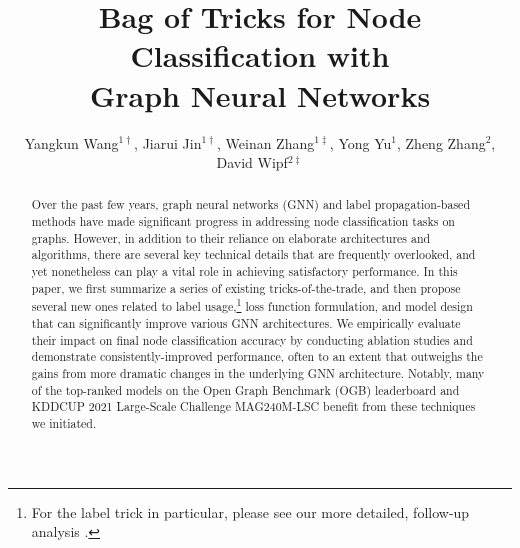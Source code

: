 \documentclass[sigconf,screen,nonacm]{acmart} \usepackage{booktabs}
\begin{document}
\sloppy


\title{Bag of Tricks for Node Classification with\\Graph Neural Networks}
\author{Yangkun Wang$^{1\dag}$, Jiarui Jin$^{1\dag}$, Weinan Zhang$^{1\ddagger}$, Yong Yu$^1$, Zheng Zhang$^2$, David Wipf$^{2\ddagger}$}
\renewcommand{\shorttitle}{Bag of Tricks for Node Classification with Graph Neural Networks}
\renewcommand{\shortauthors}{Y. Wang, et al.}

\begin{abstract}
Over the past few years, graph neural networks (GNN) and label propagation-based methods have made significant progress in addressing node classification tasks on graphs.  However, in addition to their reliance on elaborate architectures and algorithms, there are several key technical details that are frequently overlooked, and yet nonetheless can play a vital role in achieving satisfactory performance.  In this paper, we first summarize a series of existing tricks-of-the-trade, and then propose several new ones related to label usage,\footnote{For the label trick in particular, please see our more detailed, follow-up analysis \cite{wang2021why}.} loss function formulation, and model design that can significantly improve various GNN architectures.  We empirically evaluate their impact on final node classification accuracy by conducting ablation studies and demonstrate consistently-improved performance, often to an extent that outweighs the gains from more dramatic changes in the underlying GNN architecture.  Notably, many of the top-ranked models on the Open Graph Benchmark (OGB) leaderboard and KDDCUP 2021 Large-Scale Challenge MAG240M-LSC benefit from these techniques we initiated.
\end{abstract}

\maketitle
{
\renewcommand{\thefootnote}{\fnsymbol{footnote}}
}
\end{document}
